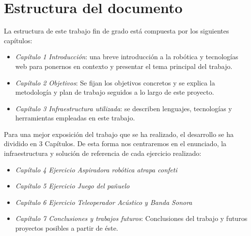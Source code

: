 \newpage
\section{Estructura del documento}

La estructura de este trabajo fin de grado está compuesta por los siguientes capítulos:

\begin{itemize}
    \item \textit{Capítulo 1 Introducción}: una breve introducción a la robótica y tecnologías web para ponernos en contexto y presentar el tema principal del trabajo.
    \item \textit{Capítulo 2 Objetivos}: Se fijan los objetivos concretos y se explica la metodología y plan de trabajo seguidos a lo largo de este proyecto.
    \item \textit{Capítulo 3 Infraestructura utilizada}: se describen lenguajes, tecnologías y herramientas empleadas en este trabajo.
\end{itemize}

Para una mejor exposición del trabajo que se ha realizado, el desarrollo se ha dividido en 3 Capítulos. De esta forma nos centraremos en el enunciado, la infraestructura y solución de referencia de cada ejercicio realizado:
    
\begin{itemize}
    \item \textit{Capítulo 4 Ejercicio Aspiradora robótica atrapa confeti}
 
    \item \textit{Capítulo 5 Ejercicio Juego del pañuelo}
    
    \item \textit{Capítulo 6 Ejercicio Teleoperador Acústico y Banda Sonora}
    
    \item \textit{Capítulo 7 Conclusiones y trabajos futuros}: Conclusiones del trabajo y futuros proyectos posibles a partir de éste.
  \end{itemize}
